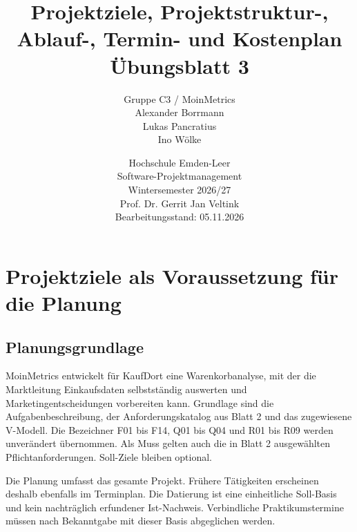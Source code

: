 \documentclass[a4paper,10pt]{article}
\title{Projektziele, Projektstruktur-, Ablauf-, Termin- und Kostenplan\\{\large Übungsblatt 3}}
\author{Gruppe C3 / MoinMetrics\\Alexander Borrmann\\Lukas Pancratius\\Ino Wölke}
\date{Hochschule Emden-Leer\\Software-Projektmanagement\\Wintersemester 2026/27\\Prof. Dr. Gerrit Jan Veltink\\[1em]Bearbeitungsstand: 05.11.2026}
\begin{document}
\maketitle
\thispagestyle{fancy}
\clearpage
\section*{Projektziele als Voraussetzung für die Planung}
\subsection*{Planungsgrundlage}
MoinMetrics entwickelt für KaufDort eine Warenkorbanalyse, mit der die Marktleitung Einkaufsdaten selbstständig auswerten und Marketingentscheidungen vorbereiten kann. Grundlage sind die Aufgabenbeschreibung, der Anforderungskatalog aus Blatt 2 und das zugewiesene V-Modell. Die Bezeichner F01 bis F14, Q01 bis Q04 und R01 bis R09 werden unverändert übernommen. Als Muss gelten auch die in Blatt 2 ausgewählten Pflichtanforderungen. Soll-Ziele bleiben optional.

Die Planung umfasst das gesamte Projekt. Frühere Tätigkeiten erscheinen deshalb ebenfalls im Terminplan. Die Datierung ist eine einheitliche Soll-Basis und kein nachträglich erfundener Ist-Nachweis. Verbindliche Praktikumstermine müssen nach Bekanntgabe mit dieser Basis abgeglichen werden.
\end{document}
